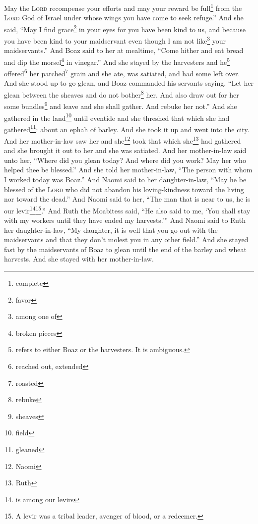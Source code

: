 \begin{inparaenum}
     May the \textsc{Lord} recompense your efforts and may your reward be full\footnote{complete} from the \textsc{Lord} God of Israel under whose wings you have come to seek refuge.''%
     And she said, ``May I find grace\footnote{favor} in your eyes for you have been kind to us, and because you have been kind to your maidservant even though I am not like\footnote{among one of} your maidservants.''%
     And Boaz said to her at mealtime, ``Come hither and eat bread and dip the morsel\footnote{broken pieces} in vinegar.'' And she stayed by the harvesters and he\footnote{refers to either Boaz or the harvesters. It is ambiguous.} offered\footnote{reached out, extended} her parched\footnote{roasted} grain and she ate, was satiated, and had some left over.%
     And she stood up to go glean, and Boaz commanded his servants saying, ``Let her glean between the sheaves and do not bother\footnote{rebuke} her.%
     And also draw out for her some bundles\footnote{sheaves} and leave and she shall gather. And rebuke her not.''%
     And she gathered in the land\footnote{field} until eventide and she threshed that which she had gathered\footnote{gleaned}: about an ephah of barley.%
     And she took it up and went into the city. And her mother-in-law saw her and she\footnote{Naomi} took that which she\footnote{Ruth} had gathered and she brought it out to her and she was satiated.%
     And her mother-in-law said unto her, ``Where did you glean today? And where did you work? May her who helped thee be blessed.'' And she told her mother-in-law, ``The person with whom I worked today was Boaz.''%
     And Naomi said to her daughter-in-law, ``May he be blessed of the \textsc{Lord} who did not abandon his loving-kindness toward the living nor toward the dead.'' And Naomi said to her, ``The man that is near to us, he is our levir\footnote{is among our levirs}\footnote{A levir was a tribal leader, avenger of blood, or a redeemer.}.''%
     And Ruth the Moabitess said, ``He also said to me, `You shall stay with my workers until they have ended my harvests.'''%
     And Naomi said to Ruth her daughter-in-law, ``My daughter, it is well that you go out with the maidservants and that they don't molest you in any other field.''%
     And she stayed fast by the maidservants of Boaz to glean until the end of the barley and wheat harvests. And she stayed with her mother-in-law.%
\end{inparaenum}
